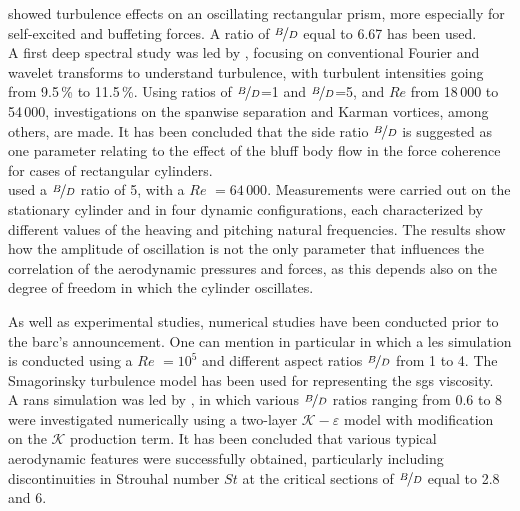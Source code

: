 \documentclass[12pt,twoside]{report}
\newcommand{\Reynolds}{$Re$ }
\newcommand{\keps}{$\mathcal{K}-\varepsilon$ }
\begin{document}
\clearpage

\cite{haan_anatomy_2009} showed turbulence effects on an oscillating rectangular prism, more especially for self-excited and buffeting forces. A ratio of $\nicefrac{B}{D}$ equal to 6.67 has been used. \\

A first deep spectral study was led by \cite{le_spanwise_2009}, focusing on conventional Fourier and wavelet transforms to understand turbulence, with turbulent intensities going from 9.5\,\% to 11.5\,\%. Using ratios of $\nicefrac{B}{D}$=1 and $\nicefrac{B}{D}$=5, and \Reynolds from 18\,000 to 54\,000, investigations on the spanwise separation and Karman vortices, among others, are made. It has been concluded that the side ratio $\nicefrac{B}{D}$ is suggested as one parameter relating to the effect of the bluff body flow in the force coherence for cases of rectangular cylinders. \\

\cite{ricciardelli_effects_2010} used a $\nicefrac{B}{D}$ ratio of 5, with a \Reynolds$=64\,000$. Measurements were carried out on the stationary cylinder and in four dynamic configurations, each characterized by different values of the heaving and pitching natural frequencies. The results show how the amplitude of oscillation is not the only parameter that influences the correlation of the aerodynamic pressures and forces, as this depends also on the degree of freedom in which the cylinder oscillates. \\

\vspace*{0.5cm}

As well as experimental studies, numerical studies have been conducted prior to the \gls{barc}’s announcement. One can mention in particular \cite{yu_parametric_1998} in which a \gls{les} simulation is conducted using a \Reynolds $=10^5$ and different aspect ratios $\nicefrac{B}{D}$ from 1 to 4. The Smagorinsky turbulence model has been used for representing the \gls{sgs} viscosity.  \\

A \gls{rans} simulation was led by \cite{shimada_application_2002}, in which various $\nicefrac{B}{D}$ ratios ranging from 0.6 to 8 were investigated numerically using a two-layer \keps model with modification on the $\mathcal{K}$ production term. It has been concluded that various typical aerodynamic features were successfully obtained, particularly including discontinuities in Strouhal number $St$ at the critical sections of $\nicefrac{B}{D}$ equal to 2.8 and 6. \\
\end{document}
